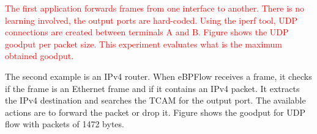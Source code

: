 \begin{table}[t]
\centering
\caption{eBPF programs used during experiments.}
\label{tbl:example-sizes}
\end{table}

\textcolor{red}{The first application forwards frames from one interface to another. There is no learning involved, the output ports are hard-coded. Using the iperf tool, UDP connections are created between terminals A and B. Figure %
shows the UDP goodput per packet size. This experiment evaluates what is the maximum obtained goodput.}

The second example is an IPv4 router. When eBPFlow receives a frame, it checks if the frame is an Ethernet frame and if it contains an IPv4 packet. It extracts the IPv4 destination and searches the TCAM for the output port. The available actions are to forward the packet or drop it. Figure %
shows the goodput for UDP flow with packets of 1472 bytes.


